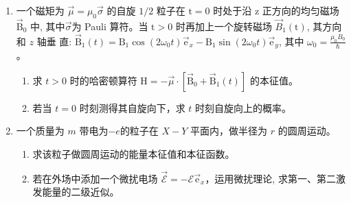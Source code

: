\begin{enumerate}
\item 
一个磁矩为 $\vec{\mu}=\mu_{0} \vec{\sigma}$ 的自旋 $1 / 2$ 粒子在 $\mathrm{t}=0$ 时处于沿 $\mathrm{z}$ 正方向的均匀磁场 $\overrightarrow{\mathrm{B}}_{0}$
中, 其中$ \overrightarrow{\sigma} $为 Pauli 算符。当 $\mathrm{t}>0$ 时再加上一个旋转磁场 $\vec{B}_{1}(\mathrm{t})$, 其方向和 $z$ 轴垂	
直: $\overrightarrow{\mathrm{B}}_{1}(t)=\mathrm{B}_{1} \cos \left(2 \omega_{0} t \right) \overrightarrow{\mathrm{e}}_{x}-\mathrm{B}_{1} \sin \left(2 \omega_{0} t\right) \overrightarrow{\mathrm{e}}_{y}$, 其中 $\omega_{0}=\frac{\mu_{0} B_{0}}{\hbar}$ 。
\begin{enumerate}
	\item
	求 $t>0$ 时的哈密顿算符 $\mathrm{H}=-\vec{\mu} \cdot\left[\overrightarrow{\mathrm{B}}_{0}+\overrightarrow{\mathrm{B}}_{1}({t})\right]$ 的本征值。 
	\item 
	若当 $t=0$ 时刻测得其自旋向下，求 $t$ 时刻自旋向上的概率。
	
	
	
	
\end{enumerate}
\banswer{
	
}


\newpage
\item 
一个质量为 $m$ 带电为$ -e  $的粒子在 $X-Y$ 平面内，做半径为 $r$ 的圆周运动。
\begin{enumerate}
	\item
	求该粒子做圆周运动的能量本征值和本征函数。
	\item 
	 若在外场中添加一个微扰电场 $\overrightarrow{\mathscr{E}}=-\mathscr{E} \overrightarrow{\mathrm{e}}_{x}$，运用微扰理论, 求第一、第二激 发能量的二级近似。
	
	
	
\end{enumerate}

\banswer{
	
}



\end{enumerate}
